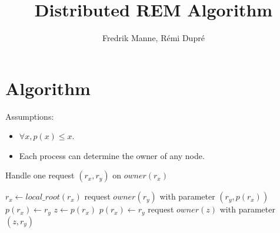 \documentclass[12px]{article}
\title{Distributed REM Algorithm}
\author{Fredrik Manne, Rémi Dupré}
\begin{document}
  \maketitle

  \section{Algorithm}
  Assumptions:
  \begin{itemize}
    \item $\forall x, p(x) \leq x$.
    \item Each process can determine the owner of any node.
  \end{itemize}

  \begin{algorithm}
    \caption{Handle one request $(r_x, r_y)$ on $owner(r_x)$}
    \begin{algorithmic}
      \State $r_x \gets local\_root(r_x)$
      \State
        \State request $owner(r_y)$ with parameter $(r_y, p(r_x))$
          \State $p(r_x) \gets r_y$
        \Else
          \State $z \gets p(r_x)$
          \State $p(r_x) \gets r_y$
          \State request $owner(z)$ with parameter $(z, r_y)$
        \EndIf
      \EndIf
    \end{algorithmic}
  \end{algorithm}
\end{document}
